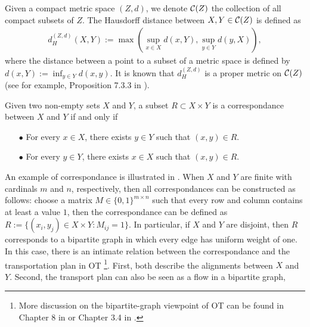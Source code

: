 Given a compact metric space $(Z, d)$, we denote $\mathcal C(Z)$ the collection of all compact subsets of
$Z$. The Hausdorff distance between $X, Y \in \mathcal C(Z)$ is defined as
\begin{align}
    d_{H}^{(Z, d)}(X,Y) := \max \left( \sup_{x \in X} d(x,Y), \sup_{y \in Y} d(y,X) \right),
\end{align}
where the distance between a point to a subset of a metric space is defined by
$d(x,Y) := \inf_{y \in Y} d(x,y)$.
It is known that $d_{H}^{(Z, d)}$ is a proper metric on $\mathcal C(Z)$ (see for example,
Proposition 7.3.3 in \citep{Burago01}).
\begin{definition}[Correspondance]
Given two non-empty sets $X$ and $Y$,
a subset $R \subset X \times Y$ is a correspondance between $X$ and $Y$ if and only if
\begin{itemize}
    \item[$\bullet$] For every $x \in X$, there exists $y \in Y$ such that $(x,y) \in R$.
    \item[$\bullet$] For every $y \in Y$, there exists $x \in X$ such that $(x,y) \in R$.
\end{itemize}
\end{definition}
An example of correspondance is illustrated in .
When $X$ and $Y$ are finite with cardinals $m$ and $n$, respectively,
then all correspondances can be constructed as follows:
choose a matrix $M \in \{0,1 \}^{m \times n}$ such that every row and column
contains at least a value $1$, then the correspondance can be defined as
$R:= \{(x_i, y_j) \in X \times Y: M_{ij} = 1 \}$. In particular, if $X$ and $Y$ are disjoint,
then $R$ corresponds to a bipartite graph in which every edge has uniform weight of one.
In this case, there is an intimate relation between the correspondance
and the transportation plan in OT
\footnote{More discussion on the bipartite-graph viewpoint of OT can be found in
Chapter 8 in \citep{Brualdi06} or Chapter 3.4 in \citep{Peyre19}.}.
First, both describe the alignments between $X$ and $Y$.
Second, the transport plan can also be seen as a flow in a bipartite graph,
